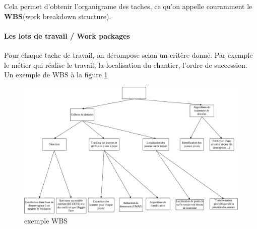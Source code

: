 Cela permet d'obtenir l'organigrame des taches, ce qu'on appelle couramment le \textbf{WBS}(work breakdown structure).\\

\paragraph*{Les lots de travail / Work packages}
Pour chaque tache de travail, on décompose selon un critère donné. Par exemple le métier qui réalise le travail, la localisation du chantier, l'ordre de succession.
Un exemple de WBS à la figure \ref{fig:exemple_wbs}
\begin{figure}
	\begin{center}
		\includegraphics[scale=0.65]{images/wbs.png}
		\caption{exemple WBS}
		\label{fig:exemple_wbs}
	\end{center}
\end{figure}
